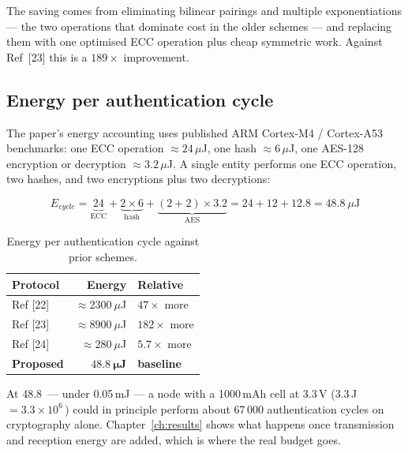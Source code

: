 The saving comes from eliminating bilinear pairings and multiple exponentiations --- the two
operations that dominate cost in the older schemes --- and replacing them with one optimised
ECC operation plus cheap symmetric work. Against Ref~[23] this is a $189\times$ improvement.

\subsection{Energy per authentication cycle}

The paper's energy accounting uses published ARM Cortex-M4 / Cortex-A53 benchmarks:
one ECC operation $\approx 24\,\mu$J, one hash $\approx 6\,\mu$J, one AES-128
encryption or decryption $\approx 3.2\,\mu$J. A single entity performs one ECC operation,
two hashes, and two encryptions plus two decryptions:

\begin{equation}
E_{cycle} = \underbrace{24}_{\text{ECC}}
          + \underbrace{2 \times 6}_{\text{hash}}
          + \underbrace{(2+2) \times 3.2}_{\text{AES}}
          = 24 + 12 + 12.8 = 48.8\ \mu\mathrm{J}
\label{eq:energy}
\end{equation}

\begin{table}[H]
\centering
\caption{Energy per authentication cycle against prior schemes.}
\label{tab:energy}
\small
\begin{tabular}{@{}l r l@{}}
\toprule
\textbf{Protocol} & \textbf{Energy} & \textbf{Relative}\\
\midrule
Ref [22] & $\approx 2300\ \mu$J & $47\times$ more\\
Ref [23] & $\approx 8900\ \mu$J & $182\times$ more\\
Ref [24] & $\approx 280\ \mu$J  & $5.7\times$ more\\
\midrule
\textbf{Proposed} & $\bm{48.8\ \mu}$\textbf{J} & \textbf{baseline}\\
\bottomrule
\end{tabular}
\end{table}

At 48.8\,\uJ{} --- under 0.05\,mJ --- a node with a 1000\,mAh cell at 3.3\,V
(3.3\,J $=3.3\times10^{6}$\,\uJ) could in principle perform about 67\,000 authentication
cycles on cryptography alone. Chapter~\ref{ch:results} shows what happens once transmission
and reception energy are added, which is where the real budget goes.
